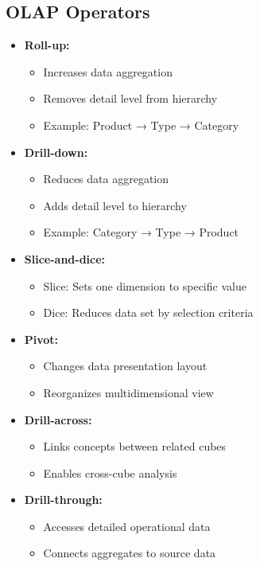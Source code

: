 \subsection{OLAP Operators}
\begin{itemize}
    \item \textbf{Roll-up:} 
        \begin{itemize}
            \item Increases data aggregation
            \item Removes detail level from hierarchy
            \item Example: Product → Type → Category
        \end{itemize}
    \item \textbf{Drill-down:}
        \begin{itemize}
            \item Reduces data aggregation
            \item Adds detail level to hierarchy
            \item Example: Category → Type → Product
        \end{itemize}
    \item \textbf{Slice-and-dice:}
        \begin{itemize}
            \item Slice: Sets one dimension to specific value
            \item Dice: Reduces data set by selection criteria
        \end{itemize}
    \item \textbf{Pivot:}
        \begin{itemize}
            \item Changes data presentation layout
            \item Reorganizes multidimensional view
        \end{itemize}
    \item \textbf{Drill-across:}
        \begin{itemize}
            \item Links concepts between related cubes
            \item Enables cross-cube analysis
        \end{itemize}
    \item \textbf{Drill-through:}
        \begin{itemize}
            \item Accesses detailed operational data
            \item Connects aggregates to source data
        \end{itemize}
\end{itemize}
